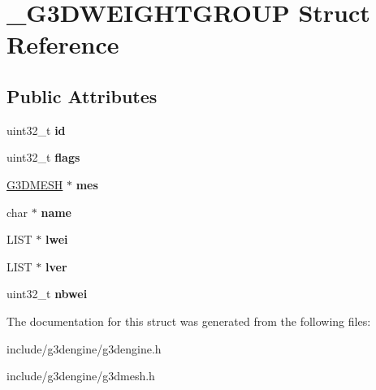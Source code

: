 \hypertarget{struct__G3DWEIGHTGROUP}{}\section{\+\_\+\+G3\+D\+W\+E\+I\+G\+H\+T\+G\+R\+O\+UP Struct Reference}
\label{struct__G3DWEIGHTGROUP}
\subsection*{Public Attributes}
\begin{DoxyCompactItemize}
\item 
\mbox{\label{struct__G3DWEIGHTGROUP_ada3bf6a5edfc9215be8fcaeb90615c2e}} 
uint32\+\_\+t {\bfseries id}
\item 
\mbox{\label{struct__G3DWEIGHTGROUP_a452a6ec50dbe9a3c354da5e029fcbfb9}} 
uint32\+\_\+t {\bfseries flags}
\item 
\mbox{\label{struct__G3DWEIGHTGROUP_af954619ac4ddce96eee3a5dea4025c38}} 
\hyperlink{struct__G3DMESH}{G3\+D\+M\+E\+SH} $\ast$ {\bfseries mes}
\item 
\mbox{\label{struct__G3DWEIGHTGROUP_a4e1dfc5c7b1491c20791ebcfb0c4ed58}} 
char $\ast$ {\bfseries name}
\item 
\mbox{\label{struct__G3DWEIGHTGROUP_a97f7ee4c5ea935cc7e622c81c31a1edb}} 
L\+I\+ST $\ast$ {\bfseries lwei}
\item 
\mbox{\label{struct__G3DWEIGHTGROUP_aadfddd72375f0dacd9476a369b847993}} 
L\+I\+ST $\ast$ {\bfseries lver}
\item 
\mbox{\label{struct__G3DWEIGHTGROUP_a09081fcc62c0378116c2808fa6f8252d}} 
uint32\+\_\+t {\bfseries nbwei}
\end{DoxyCompactItemize}


The documentation for this struct was generated from the following files\+:\begin{DoxyCompactItemize}
\item 
include/g3dengine/g3dengine.\+h\item 
include/g3dengine/g3dmesh.\+h\end{DoxyCompactItemize}
